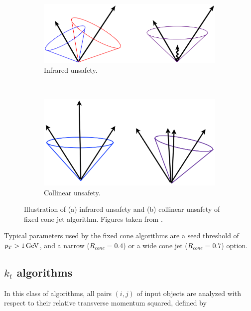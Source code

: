 \begin{figure}[t]
  \centering
  \begin{subfigure}[b]{0.95\textwidth}
    \includegraphics[width=\textwidth]{Chapter2/IRsafety.png}
    \caption{Infrared unsafety.}
    \label{fig:IRsafety}
  \end{subfigure}
  ~
  \begin{subfigure}[b]{0.9\textwidth}
    \includegraphics[width=\textwidth]{Chapter2/ColSafety.png}
    \caption{Collinear unsafety.}
    \label{fig:ColSafety}
  \end{subfigure}
  \caption[Illustration of (a) infrared unsafety and (b) collinear unsafety
          of fixed cone jet algorithm.]
          {Illustration of (a) infrared unsafety and (b) collinear unsafety
          of fixed cone jet algorithm.
          Figures taken from \cite{JetTheoreticalPictures}.}
  \label{fig:JetIRCOLsafety}
\end{figure}

Typical parameters used by the fixed cone algorithms are a seed threshold of $p_{T} > 1 \,\text{GeV}$,
and a narrow ($R_{cone} = 0.4$) or a wide cone jet ($R_{cone} = 0.7$) option.

\subsection{$k_t$ algorithms}

In this class of algorithms, all pairs $(i,j)$ of input objects are analyzed with
respect to their relative transverse momentum squared, defined by 

